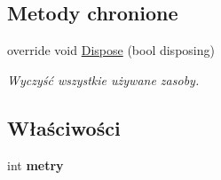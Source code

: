 \subsection*{Metody chronione}
\begin{DoxyCompactItemize}
\item 
override void \mbox{\hyperlink{classkalku__all__in__one_1_1_jednostki____i__miary_a15e157831cc6e2a022e200386106d9e6}{Dispose}} (bool disposing)
\begin{DoxyCompactList}\small\item\em Wyczyść wszystkie używane zasoby. \end{DoxyCompactList}\end{DoxyCompactItemize}
\subsection*{Właściwości}
\begin{DoxyCompactItemize}
\item 
\mbox{\label{classkalku__all__in__one_1_1_jednostki____i__miary_a0ae82bbb6f7b3a7759beec2fb1360737}} 
int {\bfseries metry}
\end{DoxyCompactItemize}
